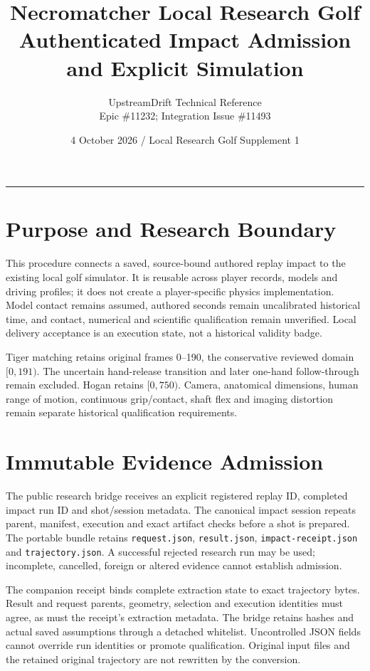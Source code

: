 \documentclass[11pt]{article}
\title{\textcolor{ink}{Necromatcher Local Research Golf\\Authenticated Impact Admission and Explicit Simulation}}
\author{UpstreamDrift Technical Reference\\Epic \#11232; Integration Issue \#11493}
\date{4 October 2026 / Local Research Golf Supplement 1}
\newcommand{\code}[1]{\nolinkurl{#1}}
\begin{document}
\maketitle
\begin{center}\rule{0.9\linewidth}{0.6pt}\end{center}
\section*{Purpose and Research Boundary}
This procedure connects a saved, source-bound authored replay impact to the
existing local golf simulator. It is reusable across player records, models and
driving profiles; it does not create a player-specific physics implementation.
Model contact remains assumed, authored seconds remain uncalibrated historical
time, and contact, numerical and scientific qualification remain unverified.
Local delivery acceptance is an execution state, not a historical validity badge.

Tiger matching retains original frames 0--190, the conservative reviewed domain
$[0,191)$. The uncertain hand-release transition and later one-hand follow-through
remain excluded. Hogan retains $[0,750)$. Camera, anatomical dimensions, human
range of motion, continuous grip/contact, shaft flex and imaging distortion
remain separate historical qualification requirements.

\section*{Immutable Evidence Admission}
The public research bridge receives an explicit registered replay ID, completed
impact run ID and shot/session metadata. The canonical impact session repeats
parent, manifest, execution and exact artifact checks before a shot is prepared.
The portable bundle retains \code{request.json}, \code{result.json},
\code{impact-receipt.json} and \code{trajectory.json}. A successful rejected
research run may be used; incomplete, cancelled, foreign or altered evidence
cannot establish admission.

The companion receipt binds complete extraction state to exact trajectory bytes.
Result and request parents, geometry, selection and execution identities must
agree, as must the receipt's extraction metadata. The bridge retains hashes and
actual saved assumptions through a detached whitelist. Uncontrolled JSON fields
cannot override run identities or promote qualification. Original input files
and the retained original trajectory are not rewritten by the conversion.
\end{document}

